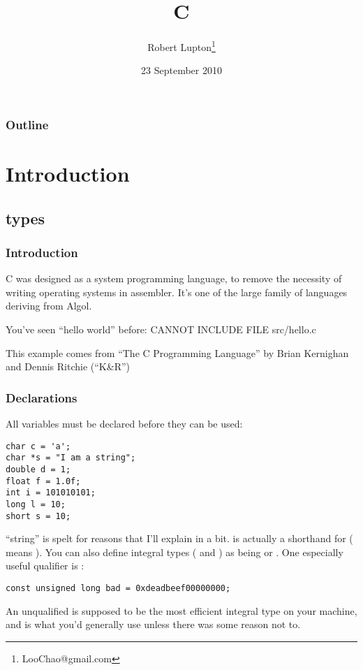 \documentclass[10pt, t]{beamer}
\title{C}
\author{Robert Lupton\thanks{LooChao@gmail.com}}
\date{23 September 2010}
\begin{document}
\maketitle

\begin{frame}
\frametitle{Outline}
\setcounter{tocdepth}{3}
\tableofcontents
\end{frame}

\section{Introduction}
\label{sec-1}
\subsection{types}
\label{sec-1-1}
\begin{frame}
\frametitle{Introduction}
\label{sec-1-1-1}

C was designed as a system programming language, to remove the necessity of writing operating systems in
assembler.  It's one of the large family of languages deriving from Algol.

\pause
You've seen ``hello world'' before:
CANNOT INCLUDE FILE src/hello.c
\pause

This example comes from ``The C Programming Language'' by Brian Kernighan and Dennis Ritchie (``K\&R'')
\end{frame}
\begin{frame}[fragile]
\frametitle{Declarations}
\label{sec-1-1-2}

 All variables must be declared before they can be used:

\begin{verbatim}
char c = 'a';
char *s = "I am a string";
double d = 1;
float f = 1.0f;
int i = 101010101;
long l = 10;
short s = 10;
\end{verbatim}



\pause
``string'' is spelt  for reasons that I'll explain in a bit.
\pause
{} is actually a shorthand for  ( means ).
You can also define integral types ( and ) as being  or .
\pause One especially useful qualifier is :

\begin{verbatim}
const unsigned long bad = 0xdeadbeef00000000;
\end{verbatim}




\pause An unqualified  is supposed to be the most efficient integral type on your machine, and is
what you'd generally use unless there was some reason not to.
\end{frame}
\end{document}
